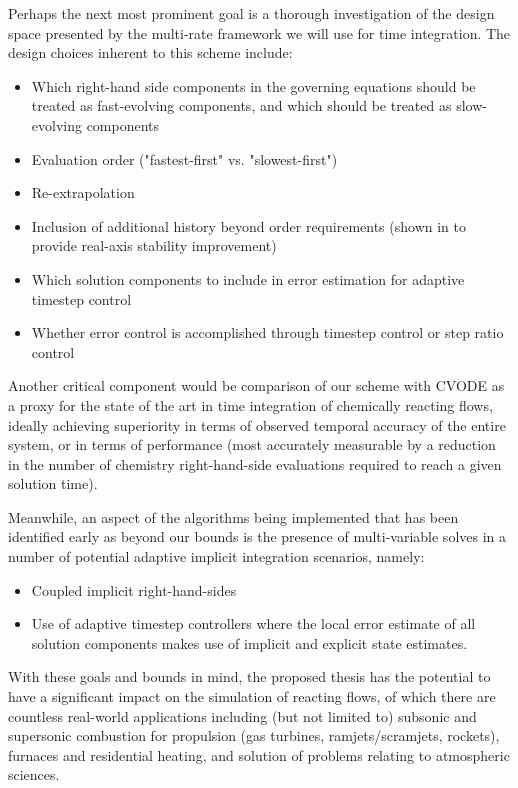 Perhaps the next most prominent goal is a thorough investigation of
the design space presented by the multi-rate framework we will use for time
integration. The design choices inherent to this
scheme include:
\begin{itemize}
\item{Which right-hand side components in the governing equations should be treated as
      fast-evolving components, and which should be treated as slow-evolving components}
\item{Evaluation order ("fastest-first" vs. "slowest-first")}
\item{Re-extrapolation}
\item{Inclusion of additional history beyond order requirements (shown in \cite{mikida2019multi}
      to provide real-axis stability improvement)}
\item{Which solution components to include in error estimation for adaptive timestep
      control}
\item{Whether error control is accomplished through timestep control or step ratio control}
\end{itemize}
Another critical component would be comparison of our scheme with CVODE as
a proxy for the state of the art in time integration of chemically reacting
flows, ideally achieving superiority in terms of observed temporal accuracy
of the entire system, or in terms of performance (most accurately measurable
by a reduction in the number of chemistry right-hand-side evaluations required
to reach a given solution time).

Meanwhile, an aspect of the algorithms being implemented that has been identified
early as beyond our bounds is the presence of multi-variable solves in a number of
potential adaptive implicit integration scenarios, namely:
\begin{itemize}
\item{Coupled implicit right-hand-sides}
\item{Use of adaptive timestep controllers where the local error estimate
      of all solution components makes use of implicit and explicit state
      estimates.}
\end{itemize}

With these goals and bounds in mind, the proposed thesis has the potential to
have a significant impact on the simulation of reacting flows, of which there
are countless real-world applications including (but not limited to) subsonic
and supersonic combustion for propulsion (gas turbines, ramjets/scramjets,
rockets), furnaces and residential heating, and solution of problems relating
to atmospheric sciences.

